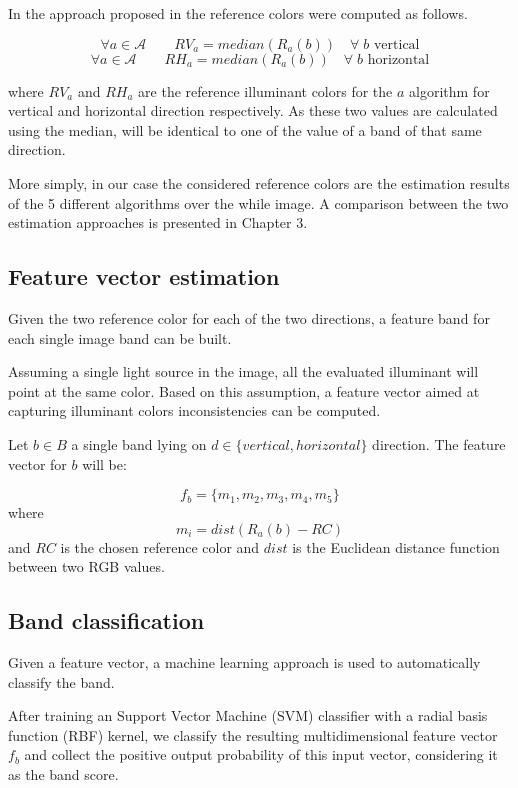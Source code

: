 In the approach proposed in \cite{fan2015image} the reference colors were computed as follows.
 
$$
\forall a \in \mathcal{A} \qquad RV_a = median(R_a(b)) \quad \forall \; b \textrm{ vertical}
$$
$$
\forall a \in \mathcal{A} \qquad RH_a = median(R_a(b)) \quad \forall \; b \textrm{ horizontal}
$$

where $RV_a$ and $RH_a$ are the reference illuminant colors for the $a$ algorithm for vertical and horizontal direction respectively. As these two values are calculated using the median, will be identical to one of the value of a band of that same direction.

More simply, in our case the considered reference colors are the estimation results of the 5 different algorithms over the while image. A comparison between the two estimation approaches is presented in Chapter 3.

\subsection{Feature vector estimation}

Given the two reference color for each of the two directions, a feature band for each single image band can be built.

Assuming a single light source in the image, all the evaluated illuminant will point at the same color.
Based on this assumption, a feature vector aimed at capturing illuminant colors inconsistencies can be computed.

Let $b \in B$ a single band lying on $d \in \{vertical, horizontal\}$ direction. The feature vector for $b$ will be:

\begin{equation}\label{eq:regionsfeaturevector}
f_{b} = \{m_1, m_2, m_3, m_4, m_5\}
\end{equation}
where
$$
m_i = dist(R_a(b) - RC)
$$
and $RC$ is the chosen reference color and $dist$ is the Euclidean distance function between two RGB values.

\subsection{Band classification}

Given a feature vector, a machine learning approach is used to automatically classify the band. 

After training an Support Vector Machine (SVM)\cite{bishop2007pattern} classifier with a radial basis function (RBF) kernel, we classify the resulting multidimensional feature vector $f_b$ and collect the positive output probability of this input vector, considering it as the band score.

